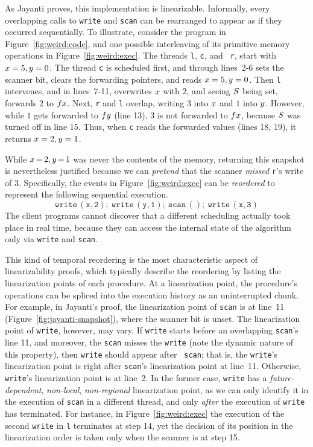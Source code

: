 
 
As Jayanti proves, this implementation is linearizable. Informally,
every overlapping calls to {\tt write} and {\tt scan} can be
rearranged to appear as if they occurred sequentially.  To illustrate,
consider the program in Figure~\ref{fig:weird:code}, and one possible
interleaving of its primitive memory operations in
Figure~\ref{fig:weird:exec}. The threads {\tt l}, {\tt c}, and {\tt
  r}, start with $x = 5, y = 0$.
%
The thread {\tt c} is scheduled first, and through lines~2-6 sets the
scanner bit, clears the forwarding pointers, and reads $x = 5, y =
0$. Then {\tt l} intervenes, and in lines~7-11, overwrites $x$ with
$2$, and seeing $S$ being set, forwards $2$ to $fx$. Next, {\tt r}
and {\tt l} overlap, writing $3$ into $x$ and $1$ into $y$. However,
while $1$ gets forwarded to $fy$ (line 13), $3$ is not forwarded to
$fx$, because $S$ was turned off in line 15. Thus, when {\tt c}
reads the forwarded values (lines 18, 19), it returns $x = 2, y =
1$. 

While $x\,{=}\,2, y\,{=}\,1$ was never the contents of the memory,
returning this snapshot is nevertheless justified because we can
\emph{pretend} that the scanner \emph{missed} {\tt r}'s write of
$3$. Specifically, the events in Figure~\ref{fig:weird:exec} can be
\emph{reordered} to represent the following sequential execution.
%
\begin{equation}
\mathtt{write\, (x, 2);\ write\, (y,1);\ scan\, ();\ write\, (x,
  3)} \label{eq:lin}
\end{equation}
The client programs cannot discover that a different scheduling
actually took place in real time, because they can access the internal
state of the algorithm only via {\tt write} and {\tt scan}.

This kind of temporal reordering is the most characteristic aspect of
linearizability proofs, which typically describe the reordering by
listing the linearization points of each procedure. At a linearization
point, the procedure's operations can be spliced into the execution
history as an uninterrupted chunk. For example, in Jayanti's proof,
the linearization point of {\tt scan} is at line~11
(Figure~\ref{fig:jayanti-snapshot}), where the scanner bit is
unset. The linearization point of {\tt write}, however, may vary. If
{\tt write} starts before an overlapping {\tt scan}'s line 11, and
moreover, the {\tt scan} misses the {\tt write} (note the dynamic
nature of this property), then {\tt write} should appear after {\tt
  scan}; that is, the {\tt write}'s linearization point is right after
{\tt scan}'s linearization point at line~11. 
%
Otherwise, {\tt write}'s linearization point is at line~2.
%
In the former case, {\tt write} has a \emph{future-dependent},
\emph{non-local}, \emph{non-regional} linearization point, as we can
only identify it in the execution of {\tt scan} in a different thread,
and only \emph{after} the execution of {\tt write} has terminated. For
instance, in Figure~\ref{fig:weird:exec} the execution of the second
{\tt write} in \texttt{l} terminates at step 14, yet the decision of
its position in the linearization order is taken only when the scanner
is at step 15.


